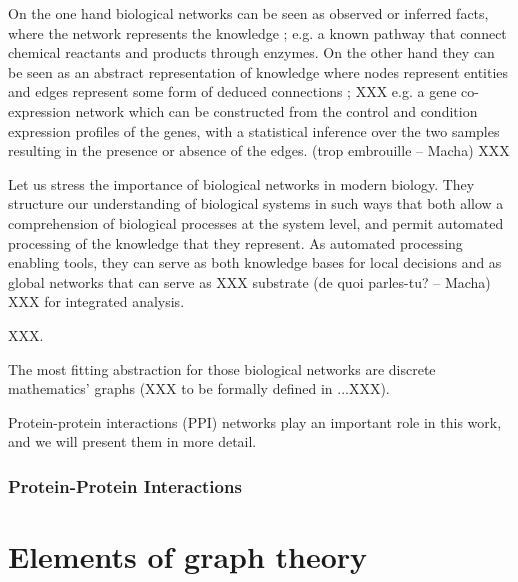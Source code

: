 		On the one hand biological networks can be seen as observed or inferred facts, where the network represents the knowledge ; e.g. a known pathway that connect chemical reactants and products through enzymes.
		On the other hand they can be seen as an abstract representation of knowledge where nodes represent entities and edges represent some form of deduced connections ; XXX e.g. a gene co-expression network which can be constructed from the control and condition expression profiles of the genes, with a statistical inference over the two samples resulting in the presence or absence of the edges. (trop embrouille -- Macha) XXX

		Let us stress the importance of biological networks in modern biology.
		They structure our understanding of biological systems in such ways that both allow a comprehension of biological processes at the system level, and permit automated processing of the knowledge that they represent.
		As automated processing enabling tools, they can serve as both knowledge bases for local decisions and as global networks that can serve as XXX substrate (de quoi parles-tu? -- Macha) XXX for integrated analysis.

		XXX.

		The most fitting abstraction for those biological networks are discrete mathematics' graphs (XXX to be formally defined in ...XXX).

		Protein-protein interactions (PPI) networks play an important role in this work, and we will present them in more detail.

		\subsubsection{Protein-Protein Interactions}



\section{Elements of graph theory}

